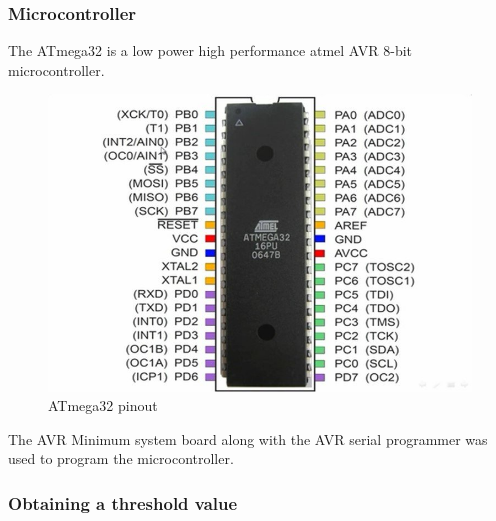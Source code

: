 \documentclass[12pt]{article}
\begin{document}
{	\subsubsection{Microcontroller}
	The ATmega32 is a low power high performance atmel AVR 8-bit microcontroller. 
			\begin{figure}[!htbp]
				\centering
				\includegraphics[scale = 1]{atmega32.jpg}
				\caption{ATmega32 pinout}
			\end{figure}
	
	The AVR Minimum system board along with the AVR serial programmer was used to program the microcontroller.
	
		
	\subsubsection{Obtaining a threshold value}
	\label{sec:4.3.2}

}
\end{document}
